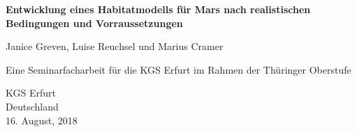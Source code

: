 \begin{titlepage}
  \begin{center}
      \vspace*{1cm}

      \huge
      \textbf{Entwicklung eines Habitatmodells für Mars nach realistischen Bedingungen und Vorraussetzungen}

      \vspace{1.5cm}

      \large
      Janice Greven, Luise Reuchsel und Marius Cramer

      \vfill

      \large
      Eine Seminarfacharbeit für die KGS Erfurt im Rahmen der Thüringer Oberstufe

      \vspace{0.8cm}


      \normalsize
      KGS Erfurt\\
      Deutschland\\
      16. August, 2018

  \end{center}
\end{titlepage}
